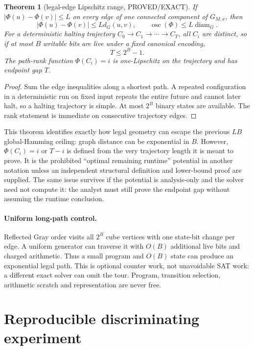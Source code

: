 \documentclass[11pt]{article}
\newtheorem{theorem}{Theorem}
\begin{document}
\begin{theorem}[legal-edge Lipschitz range, PROVED/EXACT]
If $|\Phi(u)-\Phi(v)|\le L$ on every edge of one connected component of
$G_{M,x}$, then
\[
 |\Phi(u)-\Phi(v)|\le Ld_G(u,v),\qquad
 \operatorname{osc}(\Phi)\le L\operatorname{diam}_G.
\]
For a deterministic halting trajectory
$C_0\to C_1\to\cdots\to C_T$, all $C_i$ are distinct, so if at most $B$
writable bits are live under a fixed canonical encoding,
\[
 T\le 2^B-1.
\]
The path-rank function $\Phi(C_i)=i$ is one-Lipschitz on the trajectory and
has endpoint gap $T$.
\end{theorem}
\begin{proof}
Sum the edge inequalities along a shortest path.  A repeated configuration
in a deterministic run on fixed input repeats the entire future and cannot
later halt, so a halting trajectory is simple.  At most $2^B$ binary states
are available.  The rank statement is immediate on consecutive trajectory
edges.
\end{proof}

This theorem identifies exactly how legal geometry can escape the previous
$LB$ global-Hamming ceiling: graph distance can be exponential in $B$.
However, $\Phi(C_i)=i$ or $T-i$ is defined from the very trajectory length it
is meant to prove.  It is the prohibited ``optimal remaining runtime''
potential in another notation unless an independent structural definition
and lower-bound proof are supplied.  The same issue survives if the
potential is analysis-only and the solver need not compute it: the analyst
must still prove the endpoint gap without assuming the runtime conclusion.

\paragraph{Uniform long-path control.}
Reflected Gray order visits all $2^B$ cube vertices with one state-bit change
per edge.  A uniform generator can traverse it with $O(B)$ additional live
bits and charged arithmetic.  Thus a small program and $O(B)$ state can
produce an exponential legal path.  This is optional counter work, not
unavoidable SAT work: a different exact solver can omit the tour.  Program,
transition selection, arithmetic scratch and representation are never free.

\section{Reproducible discriminating experiment}
\end{document}
